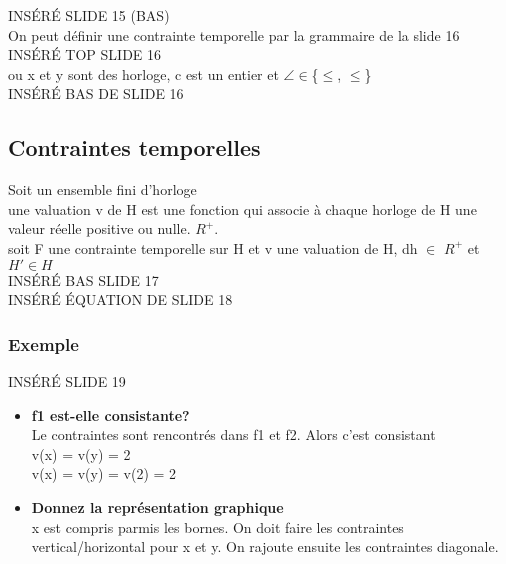 \documentclass[oneside]{book}
\begin{document}
    INSÉRÉ SLIDE 15 (BAS)\\
    
    On peut définir une contrainte temporelle par la grammaire de la slide 16\\
    
    INSÉRÉ TOP SLIDE 16\\
    
    ou x et y sont des horloge, c est un entier et $\angle$$\in$\{$\le$, $\leq$\}\\
    
    INSÉRÉ BAS DE SLIDE 16\\
    
    
    \subsection{Contraintes temporelles}
    Soit un ensemble fini d'horloge\\
    
    une valuation v de H est une fonction qui associe à chaque horloge de H une valeur réelle positive ou nulle. $R^{+}$.\\
    
    soit F une contrainte temporelle sur H et v une valuation de H, dh $\in$ $R^+$ et $H' \in H $\\
    
    INSÉRÉ BAS SLIDE 17\\
       
    INSÉRÉ ÉQUATION DE SLIDE 18\\
    
    \subsubsection{Exemple}
    INSÉRÉ SLIDE 19\\
    
    \begin{itemize}
        \item 
        \textbf{f1 est-elle consistante?} \\
        Le contraintes sont rencontrés dans f1 et f2. Alors c'est consistant\\
         v(x) = v(y) = 2\\
         v(x) = v(y) = v(2) = 2
         
        \item 
        \textbf{Donnez la représentation graphique}\\
         x est compris parmis les bornes. On doit faire les contraintes vertical/horizontal pour x et y. On rajoute ensuite les contraintes diagonale.\\
         
        
        
        
    \end{itemize}
    
\end{document}

